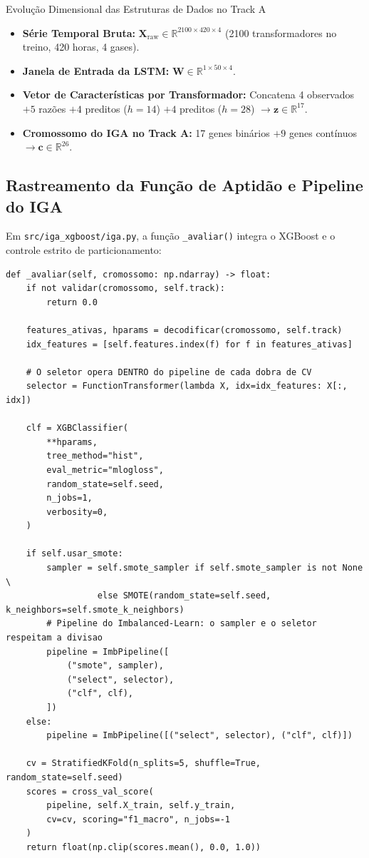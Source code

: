 \documentclass[11pt,a4paper]{article}
\begin{document}
\begin{codeBox}{Evolução Dimensional das Estruturas de Dados no Track A}
\begin{itemize}
  \item \textbf{Série Temporal Bruta:} $\mathbf{X}_{\text{raw}} \in \mathbb{R}^{2100 \times 420 \times 4}$ (2100 transformadores no treino, 420 horas, 4 gases).
  \item \textbf{Janela de Entrada da LSTM:} $\mathbf{W} \in \mathbb{R}^{1 \times 50 \times 4}$.
  \item \textbf{Vetor de Características por Transformador:} Concatena 4 observados $+ 5$ razões $+ 4$ preditos ($h=14$) $+ 4$ preditos ($h=28$) $\to \mathbf{z} \in \mathbb{R}^{17}$.
  \item \textbf{Cromossomo do IGA no Track A:} 17 genes binários $+ 9$ genes contínuos $\to \mathbf{c} \in \mathbb{R}^{26}$.
\end{itemize}
\end{codeBox}

\subsection{Rastreamento da Função de Aptidão e Pipeline do IGA}
Em \texttt{src/iga\_xgboost/iga.py}, a função \texttt{\_avaliar()} integra o XGBoost e o controle estrito de particionamento:

\begin{lstlisting}
def _avaliar(self, cromossomo: np.ndarray) -> float:
    if not validar(cromossomo, self.track):
        return 0.0

    features_ativas, hparams = decodificar(cromossomo, self.track)
    idx_features = [self.features.index(f) for f in features_ativas]
    
    # O seletor opera DENTRO do pipeline de cada dobra de CV
    selector = FunctionTransformer(lambda X, idx=idx_features: X[:, idx])

    clf = XGBClassifier(
        **hparams,
        tree_method="hist",
        eval_metric="mlogloss",
        random_state=self.seed,
        n_jobs=1,
        verbosity=0,
    )

    if self.usar_smote:
        sampler = self.smote_sampler if self.smote_sampler is not None \
                  else SMOTE(random_state=self.seed, k_neighbors=self.smote_k_neighbors)
        # Pipeline do Imbalanced-Learn: o sampler e o seletor respeitam a divisao
        pipeline = ImbPipeline([
            ("smote", sampler),
            ("select", selector),
            ("clf", clf),
        ])
    else:
        pipeline = ImbPipeline([("select", selector), ("clf", clf)])

    cv = StratifiedKFold(n_splits=5, shuffle=True, random_state=self.seed)
    scores = cross_val_score(
        pipeline, self.X_train, self.y_train,
        cv=cv, scoring="f1_macro", n_jobs=-1
    )
    return float(np.clip(scores.mean(), 0.0, 1.0))
\end{lstlisting}
\end{document}
